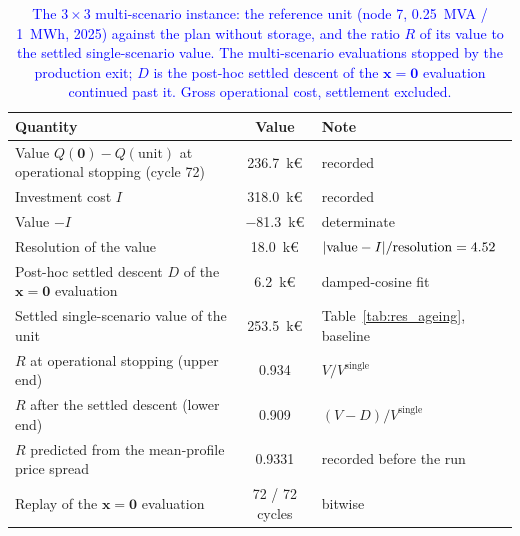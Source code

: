 \documentclass[preprint,12pt]{elsarticle}
\begin{document}
\begin{table}[htbp!]
    \centering
    \caption{\textcolor{blue}{The $3 \times 3$ multi-scenario instance: the reference unit (node 7, 0.25~MVA / 1~MWh, 2025) against the plan without storage, and the ratio $R$ of its value to the settled single-scenario value. The multi-scenario evaluations stopped by the production exit; $D$ is the post-hoc settled descent of the $\boldsymbol{x} = \boldsymbol{0}$ evaluation continued past it. Gross operational cost, settlement excluded.}}
    \label{tab:res_multiscenario}
    \scriptsize\setlength{\tabcolsep}{4pt}
    \begin{tabular}{l c l}
        \toprule
        Quantity & Value & Note \\
        \midrule    
        Value $Q(\boldsymbol{0}) - Q(\text{unit})$ at operational stopping (cycle 72) & 236.7~k\euro & recorded \\
        Investment cost $I$                                                  & 318.0~k\euro & recorded \\
        Value $- I$                                                          & $-$81.3~k\euro & determinate \\
        Resolution of the value                                              & 18.0~k\euro  & $|{\rm value} - I| / {\rm resolution} = 4.52$ \\
        Post-hoc settled descent $D$ of the $\boldsymbol{x} = \boldsymbol{0}$ evaluation & 6.2~k\euro & damped-cosine fit \\
        Settled single-scenario value of the unit                           & 253.5~k\euro & Table~\ref{tab:res_ageing}, baseline \\
        $R$ at operational stopping (upper end)                                     & 0.934 & $V / V^{\text{single}}$ \\
        $R$ after the settled descent (lower end)                            & 0.909 & $(V - D) / V^{\text{single}}$ \\
        $R$ predicted from the mean-profile price spread                     & 0.9331 & recorded before the run \\
        Replay of the $\boldsymbol{x} = \boldsymbol{0}$ evaluation           & 72 / 72 cycles & bitwise \\
        \bottomrule
    \end{tabular}
\end{table}

\end{document}
